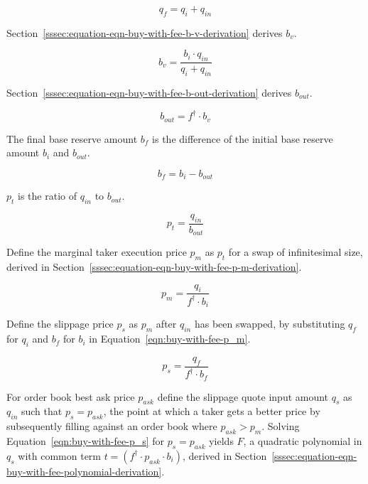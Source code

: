 \documentclass[table, twocolumn]{article}
\begin{document}
\begin{equation}\label{eqn:buy-with-fee-q_f}
	q_f = q_i + q_{in}
\end{equation}

Section~\ref{sssec:equation-eqn-buy-with-fee-b-v-derivation} derives $b_v$.

\begin{equation}\label{eqn:buy-with-fee-b_v}
	b_v  = \frac{b_i \cdot q_{in}}{q_i + q_{in}}
\end{equation}

Section~\ref{sssec:equation-eqn-buy-with-fee-b-out-derivation} derives $b_{out}$.

\begin{equation}\label{eqn:buy-with-fee-b_out}
	b_{out} = f^{\dagger} \cdot b_v
\end{equation}

The final base reserve amount $b_f$ is the difference of the initial base reserve amount
$b_i$ and $b_{out}$.

\begin{equation}\label{eqn:buy-with-fee-b_f}
	b_f = b_i - b_{out}
\end{equation}

$p_t$ is the ratio of $q_{in}$ to $b_{out}$.

\begin{equation}\label{eqn:buy-with-fee-p_t}
	p_t = \frac{q_{in}}{b_{out}}
\end{equation}

Define the marginal taker execution price $p_m$ as $p_t$ for a swap of infinitesimal
size, derived in Section~\ref{sssec:equation-eqn-buy-with-fee-p-m-derivation}.

\begin{equation}\label{eqn:buy-with-fee-p_m}
	p_m = \frac{q_i}{f^{\dagger} \cdot b_i}
\end{equation}

Define the slippage price $p_s$ as $p_m$ after $q_{in}$ has been swapped, by
substituting $q_f$ for $q_i$ and $b_f$ for $b_i$ in
Equation~\ref{eqn:buy-with-fee-p_m}.

\begin{equation}\label{eqn:buy-with-fee-p_s}
	p_s = \frac{q_f}{f^{\dagger} \cdot b_f}
\end{equation}

For order book best ask price $p_{ask}$ define the slippage quote input amount $q_s$
as $q_{in}$ such that $p_s = p_{ask}$, the point at which a taker gets a better price by
subsequently filling against an order book where $p_{ask} > p_m$. Solving
Equation~\ref{eqn:buy-with-fee-p_s} for $p_s = p_{ask}$ yields $F$, a quadratic
polynomial in $q_s$ with common term $t = (f^{\dagger} \cdot p_{ask} \cdot b_i)$,
derived in Section~\ref{sssec:equation-eqn-buy-with-fee-polynomial-derivation}.
\end{document}
